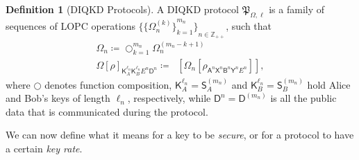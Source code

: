 \documentclass[10pt, a4paper]{article}
\numberwithin{equation}{section} %
\newcounter{stmt} %
\theoremstyle{definition}
\newtheorem{defn}[stmt]{Definition}
\theoremstyle{plain}
\newcommand{\?}{\mathrel{?}} %
\newcommand{\Z}{\mathbb{Z}} %
\newcommand{\Tr}[2][]{\mathop{\mathrm{Tr}#1}\left[ #2 \right]} %
\newcommand{\crv}[1]{\mathsf{#1}}
\newcommand{\proto}[2][_{\Omega,\ell}]{\mathfrak{#2}#1}
\begin{document}
    \begin{defn}[DIQKD Protocols]
      A DIQKD protocol \(\proto{P}\) is a family of sequences of LOPC operations \({\{{\{\Omega^{(k)}_{n}\}}_{k=1}^{m_n}\}}_{n\in\Z_{++}}\), such that
      \begin{gather}
        \Omega_n \coloneqq \bigcirc_{k=1}^{m_n} \Omega^{(m_n - k + 1)}_{n} \\
        {\Omega[\rho]}_{\crv{K}_{A}^{\ell_n} \crv{K}_{B}^{\ell_n} E^n \crv{D}^n} \coloneqq \Tr[_{\crv{D}^{(m_n)}_A \crv{D}^{(m_n)}_B}]{ \Omega_n \left[ \rho_{\crv{A}^n\crv{X}^n \crv{B}^n\crv{Y}^n E^n} \right] },
      \end{gather}
      where \(\bigcirc\) denotes function composition, \(\crv{K}_{A}^{\ell_n} = \crv{S}_{A}^{(m_n)}\) and \(\crv{K}_{B}^{\ell_n} = \crv{S}_{B}^{(m_n)}\) hold Alice and Bob's keys of length \(\ell_n\), respectively, while \(\crv{D}^n = \crv{D}^{(m_n)}\) is all the public data that is communicated during the protocol.
    \end{defn}

    We can now define what it means for a key to be \emph{secure}, or for a protocol to have a certain \emph{key rate}.
\end{document}
